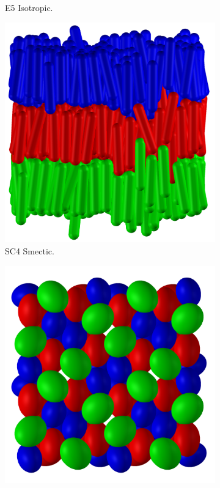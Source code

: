 \begin{figure}
\begin{center}
\begin{subfigure}{0.4\textwidth}
      \caption{E5 Isotropic.}
    \end{subfigure}
    \begin{subfigure}{0.4\textwidth}
      \includegraphics[width=\textwidth]{assets/images/configs/smectic}
      \caption{SC4 Smectic.}
    \end{subfigure}
    \begin{subfigure}{0.4\textwidth}
      \includegraphics[width=\textwidth]{assets/images/configs/biaxial}

\end{subfigure}
\end{center}
\end{figure}
